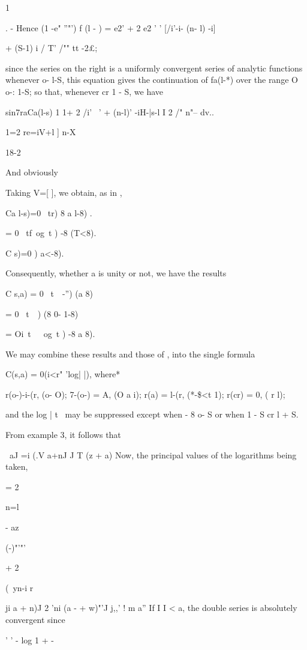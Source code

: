{{1 %

. - Hence (1 -e" ''"') f (l - ) = e2' + 2 e2 ' ' [/i'-i- (n- l) -i]

+ (S-1) i / T' /"" tt -2£;

since the series on the right is a uniformly convergent series of
analytic functions whenever o- l-S, this equation gives the
continuation of fa(l-*) over the range O o-: 1-S; so that, whenever cr
1 - S, we have

sin7raCa(l-s) 1 1+ 2 /i' ~' + (n-l)' -iH-|s-l I 2 /" n"-- dv..

1=2 re=iV+l ] n-X

18-2

%
%

And obviously

Taking V=[ ], we obtain, as in ,

Ca l-s)=0 \ tr) 8 a l-8) .

= 0 \ tf\ og\ t ) -8 (T<8).

C s)=0 ) a<-8).

Consequently, whether a is unity or not, we have the results

C s,a) = 0 \ t\ \ -'') (a 8)

= 0 \ t\ \ ) (8 0- 1-8)

= Oi\ t\ \ \ og\ t ) -8 a 8).

We may combine these results and those of , into the single
formula

C(s,a) = 0(i<r" 'log| |), where*

r(o-)-i-(r, (o- O); 7-(o-) = A, (O a i); r(a) = l-(r, (*-\$<t 1);
r(cr) = 0, ( r l);

and the log | t \ may be suppressed except when - 8 o- S or when 1 - S
cr l + S.

From  example 3,
it follows that

\ aJ =i (.V a+nJ J T (z + a) Now, the principal values of the
logarithms being taken,

= 2

n=l

- az

  (-)"'"'

+ 2

(\ yn-i r

ji a + n)J 2 'ni (a - + w)"'J j,,' ! m a'' If I I < a, the double
series is absolutely convergent since

' ' - log 1 + -

}}
